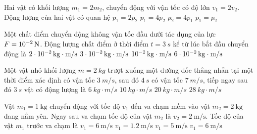 	\begin{ex}
		Hai vật có khối lượng $m_1 = 2m_2$, chuyển động với vận tốc có độ lớn $v_1 = 2v_2$. Động lượng của hai vật có quan hệ
		\choice
		{$p_1 = 2p_2$}
		{\True $p_1 = 4p_2$}
		{$p_2 = 4p_1$}
		{$p_1 = p_2$}
	\end{ex}
\begin{ex}
Một chất điểm chuyển động không vận tốc đầu dưới tác dụng của lực $F = \xsi{10^{-2}}{N}$. Động lượng chất điểm ở thời điểm $t = \SI{3}{s}$ kể từ lúc bắt đầu chuyển động là 	
	\choice
	{$\xsi{2 \cdot 10^{-2}}{kg \cdot m/s}$}
	{\True $\xsi{3 \cdot 10^{-2}}{kg \cdot m/s}$}
	{$\xsi{ 10^{-2}}{kg \cdot m/s}$}
	{$\xsi{6 \cdot 10^{-2}}{kg \cdot m/s}$}
\end{ex}
\begin{ex}
Một vật nhỏ khối lượng $m =\SI{2}{kg}$ trượt xuống một đường dốc thẳng nhẵn tại một thời điểm xác định có vận tốc $\SI{3}{m/s}$, sau đó $\SI{4}{s}$ có vận tốc $\SI{7}{m/s}$, tiếp ngay sau đó $\SI{3}{s}$ vật có động lượng là 	
	\choice
	{$\SI{6}{kg\cdot m/s}$}
	{$\SI{10}{kg\cdot m/s}$}
	{\True $\SI{20}{kg\cdot m/s}$}
	{$\SI{28}{kg\cdot m/s}$}
\end{ex}
\begin{ex}
Vật $m_1=\SI{1}{\kilogram}$ chuyển động với tốc độ $v_1$ đến va chạm mềm vào vật $m_2 =\SI{2}{\kilogram}$ đang nằm yên. Ngay sau va chạm tốc độ của vật $m_2$ là $v_2 =\SI{2}{\meter/\second}$. Tốc độ của vật $m_1$ trước va chạm là
	\choice
	{\True $v_1=\SI{6}{\meter/\second}$}
	{$v_1=\SI{1.2}{\meter/\second}$}
	{$v_1=\SI{5}{\meter/\second}$}
	{$v_1=\SI{6}{\meter/\second}$}
\end{ex}
